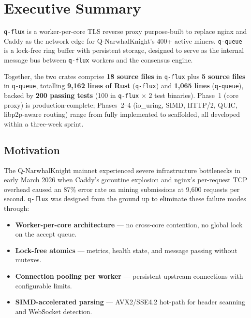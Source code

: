 \documentclass[a4paper, 11pt]{article}
\newcommand{\qflux}{\texttt{q-flux}}
\newcommand{\qqueue}{\texttt{q-queue}}
\begin{document}
\newpage
\tableofcontents
\newpage

\section{Executive Summary}

\qflux{} is a worker-per-core TLS reverse proxy purpose-built to replace
nginx and Caddy as the network edge for Q-NarwhalKnight's 400+ active miners.
\qqueue{} is a lock-free ring buffer with persistent storage, designed to
serve as the internal message bus between \qflux{} workers and the consensus
engine.

Together, the two crates comprise \textbf{18 source files} in \qflux{}
plus \textbf{5 source files} in \qqueue{}, totalling \textbf{9,162 lines
of Rust} (\qflux{}) and \textbf{1,065 lines} (\qqueue{}), backed by
\textbf{200 passing tests} (100 in \qflux{} $\times$ 2 test binaries).
Phase~1 (core proxy) is production-complete; Phases~2--4 (io\_uring,
SIMD, HTTP/2, QUIC, libp2p-aware routing) range from fully implemented
to scaffolded, all developed within a three-week sprint.

\subsection{Motivation}

The Q-NarwhalKnight mainnet experienced severe infrastructure bottlenecks
in early March 2026 when Caddy's goroutine explosion and nginx's per-request
TCP overhead caused an 87\% error rate on mining submissions at 9,600
requests per second.  \qflux{} was designed from the ground up to eliminate
these failure modes through:

\begin{itemize}[nosep]
  \item \textbf{Worker-per-core architecture} --- no cross-core contention,
        no global lock on the accept queue.
  \item \textbf{Lock-free atomics} --- metrics, health state, and message
        passing without mutexes.
  \item \textbf{Connection pooling per worker} --- persistent upstream
        connections with configurable limits.
  \item \textbf{SIMD-accelerated parsing} --- AVX2/SSE4.2 hot-path
        for header scanning and WebSocket detection.
\end{itemize}
\end{document}
